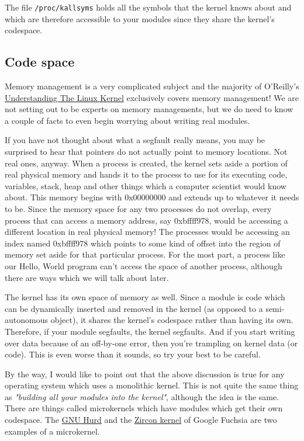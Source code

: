 \documentclass[10pt, oneside]{book}
\begin{document}
The file \verb|/proc/kallsyms| holds all the symbols that the kernel knows about and which are therefore accessible to your modules since they share the kernel's codespace.

\subsection{Code space}
\label{sec:codespace}
Memory management is a very complicated subject and the majority of O'Reilly's \href{https://www.oreilly.com/library/view/understanding-the-linux/0596005652/}{Understanding The Linux Kernel} exclusively covers memory management!
We are not setting out to be experts on memory managements, but we do need to know a couple of facts to even begin worrying about writing real modules.

If you have not thought about what a segfault really means, you may be surprised to hear that pointers do not actually point to memory locations.
Not real ones, anyway.
When a process is created, the kernel sets aside a portion of real physical memory and hands it to the process to use for its executing code, variables, stack, heap and other things which a computer scientist would know about.
This memory begins with 0x00000000 and extends up to whatever it needs to be.
Since the memory space for any two processes do not overlap, every process that can access a memory address, say 0xbffff978, would be accessing a different location in real physical memory! The processes would be accessing an index named 0xbffff978 which points to some kind of offset into the region of memory set aside for that particular process.
For the most part, a process like our Hello, World program can't access the space of another process, although there are ways which we will talk about later.

The kernel has its own space of memory as well. Since a module is code which can be dynamically inserted and removed in the kernel (as opposed to a semi-autonomous object), it shares the kernel's codespace rather than having its own.
Therefore, if your module segfaults, the kernel segfaults.
And if you start writing over data because of an off-by-one error, then you're trampling on kernel data (or code).
This is even worse than it sounds, so try your best to be careful.

By the way, I would like to point out that the above discussion is true for any operating system which uses a monolithic kernel.
This is not quite the same thing as \emph{"building all your modules into the kernel"}, although the idea is the same.
There are things called microkernels which have modules which get their own codespace.
The \href{https://www.gnu.org/software/hurd/}{GNU Hurd} and the \href{https://fuchsia.dev/fuchsia-src/concepts/kernel}{Zircon kernel} of Google Fuchsia are two examples of a microkernel.
\end{document}
